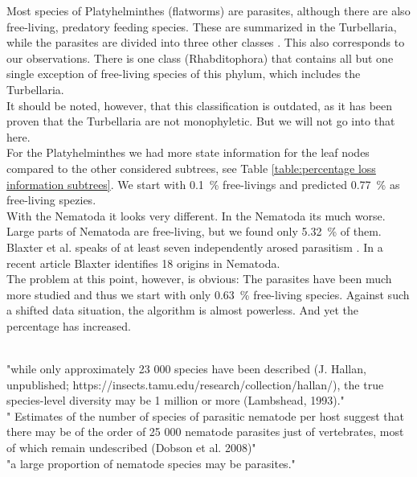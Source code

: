       Most species of Platyhelminthes (flatworms) are parasites, although there are also free-living, 
        predatory feeding species. These are summarized in the Turbellaria, while the parasites are 
        divided into three other classes \cite{Ax1961}. This also corresponds to our observations. There 
        is one class (Rhabditophora) that contains all but one single exception of free-living species 
        of this phylum, which includes the Turbellaria. \\
      It should be noted, however, that this classification is outdated, as it has been proven that 
        the Turbellaria are not monophyletic. But we will not go into that here. \\
      For the Platyhelminthes we had more state information for the leaf nodes compared to the other 
        considered subtrees, see Table \ref{table:percentage loss information subtrees}. We start with 
        0.1~\% free-livings and predicted 0.77~\% as free-living spezies. \\
     
      With the Nematoda it looks very different. In the Nematoda its much worse. Large parts of Nematoda 
        are free-living, but we found only 5.32~\% of them. Blaxter et al. speaks of at least seven 
        independently arosed parasitism \cite{Blaxter1998}. In a recent article Blaxter identifies 18 
        origins \cite{Blaxter2015} in Nematoda. \\
        The problem at this point, however, is obvious: The parasites have been much more studied and 
        thus we start with only 0.63~\% free-living species. Against such a shifted data situation, the 
        algorithm is almost powerless. And yet the percentage has increased.

       \\
      "while only approximately 23 000 species have been described (J. Hallan, unpublished; https://insects.tamu.edu/research/collection/hallan/), the true species-level diversity may be 1 million or more (Lambshead, 1993)." \\
      " Estimates of the number of species of parasitic nematode per host suggest that there may be of the order of 25 000 nematode parasites just of vertebrates, most of which remain undescribed (Dobson et al. 2008)" \\
      "a large proportion of nematode species may be parasites." \cite{Blaxter2015} \\


